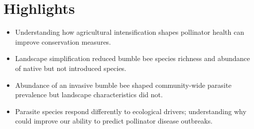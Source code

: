\documentclass[12pt]{article}
\begin{document}
\section{Highlights}

\begin{itemize}
\item Understanding how agricultural intensification shapes pollinator health can improve conservation measures.
\item Landscape simplification reduced bumble bee species richness and abundance of native but not introduced species.
\item Abundance of an invasive bumble bee shaped community-wide parasite prevalence but landscape characteristics did not.
\item Parasite species respond differently to ecological drivers; understanding why could improve our ability to predict pollinator disease outbreaks.
\end{itemize}
\end{document}
